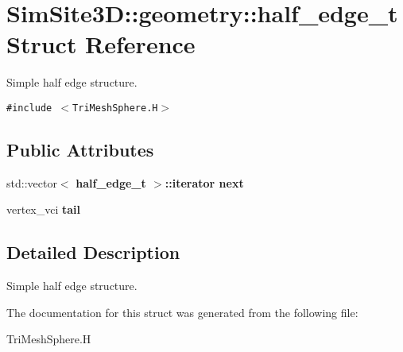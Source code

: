 \section{SimSite3D::geometry::half\_\-edge\_\-t Struct Reference}
\label{structSimSite3D_1_1geometry_1_1half__edge__t}
Simple half edge structure.  


{\tt \#include $<$Tri\-Mesh\-Sphere.H$>$}

\subsection*{Public Attributes}
\begin{CompactItemize}
\item 
std::vector$<$ \bf{half\_\-edge\_\-t} $>$::iterator \textbf{next}\label{structSimSite3D_1_1geometry_1_1half__edge__t_b9c1024184c488466c7e8f0f155ea959}

\item 
vertex\_\-vci \textbf{tail}\label{structSimSite3D_1_1geometry_1_1half__edge__t_24e846910bcc790ee9eb33bd0995b336}

\end{CompactItemize}


\subsection{Detailed Description}
Simple half edge structure. 



The documentation for this struct was generated from the following file:\begin{CompactItemize}
\item 
Tri\-Mesh\-Sphere.H\end{CompactItemize}
